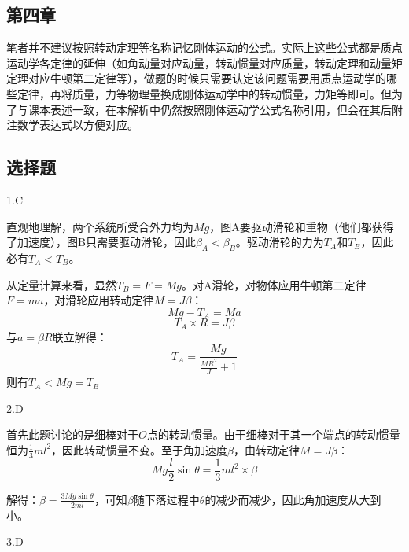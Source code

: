 \documentclass[blue, normal]{./templete/qyxfnote}
\begin{document}
\begin{multicols}{2}
	\section{第四章}
	\begin{note}
		\noindent 笔者并不建议按照转动定理等名称记忆刚体运动的公式。实际上这些公式都是质点运动学各定律的延伸（如角动量对应动量，转动惯量对应质量，转动定理和动量矩定理对应牛顿第二定律等），做题的时候只需要认定该问题需要用质点运动学的哪些定律，再将质量，力等物理量换成刚体运动学中的转动惯量，力矩等即可。但为了与课本表述一致，在本解析中仍然按照刚体运动学公式名称引用，但会在其后附注数学表达式以方便对应。
	\end{note}
		\subsection{选择题}
			1.C
			
			直观地理解，两个系统所受合外力均为$ Mg $，图A要驱动滑轮和重物（他们都获得了加速度），图B只需要驱动滑轮，因此$ \beta_A<\beta_B $。驱动滑轮的力为$ T_A $和$ T_B $，因此必有$ T_A<T_B $。\par
			从定量计算来看，显然$ T_B=F=Mg $。对A滑轮，对物体应用牛顿第二定律$F=ma$，对滑轮应用转动定律$M=J\beta$：
			\[Mg-T_A=Ma\]
			\[T_A\times R=J\beta\]
			与$ a=\beta R $联立解得：
			\[T_A=\frac{Mg}{\frac{MR^2}{J}+1}\]
			则有$ T_A< Mg=T_B$
			
			2.D
			
			\par
			首先此题讨论的是细棒对于$ O $点的转动惯量。由于细棒对于其一个端点的转动惯量恒为$ \frac{1}{3}ml^2 $，因此转动惯量不变。至于角加速度$ \beta $，由转动定律$M=J\beta$：
			\[Mg\frac{l}{2}\sin\theta=\frac{1}{3}ml^2\times\beta\]\par
			解得：$ \beta=\frac{3Mg\sin\theta}{2ml} $，可知$ \beta $随下落过程中$ \theta $的减少而减少，因此角加速度从大到小。
			
			3.D
			

\end{multicols}
\end{document}

